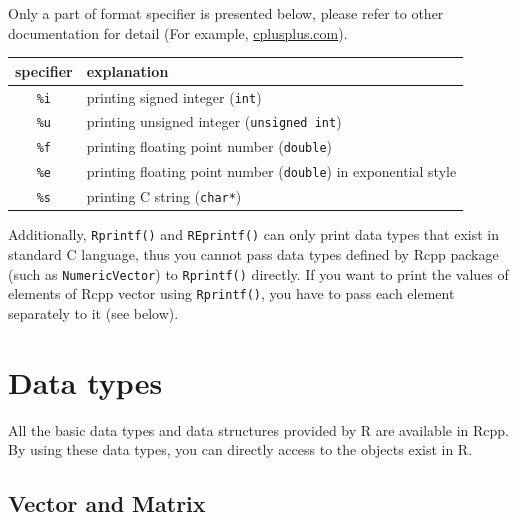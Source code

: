 \documentclass[]{book}
\newenvironment{Shaded}{\begin{snugshade}}{\end{snugshade}}
\newcommand{\DataTypeTok}[1]{\textcolor[rgb]{0.13,0.29,0.53}{#1}}
\newcommand{\DecValTok}[1]{\textcolor[rgb]{0.00,0.00,0.81}{#1}}
\newcommand{\SpecialCharTok}[1]{\textcolor[rgb]{0.00,0.00,0.00}{#1}}
\newcommand{\StringTok}[1]{\textcolor[rgb]{0.31,0.60,0.02}{#1}}
\newcommand{\CommentTok}[1]{\textcolor[rgb]{0.56,0.35,0.01}{\textit{#1}}}
\newcommand{\ControlFlowTok}[1]{\textcolor[rgb]{0.13,0.29,0.53}{\textbf{#1}}}
\newcommand{\NormalTok}[1]{#1}
\theoremstyle{definition}
\theoremstyle{definition}
\theoremstyle{remark}
\begin{document}
Only a part of format specifier is presented below, please refer to
other documentation for detail (For example,
\href{http://www.cplusplus.com/reference/cstdio/printf/}{cplusplus.com}).

\begin{longtable}[]{@{}cl@{}}
\toprule
specifier & explanation\tabularnewline
\midrule
\endhead
\texttt{\%i} & printing signed integer (\texttt{int})\tabularnewline
\texttt{\%u} & printing unsigned integer
(\texttt{unsigned\ int})\tabularnewline
\texttt{\%f} & printing floating point number
(\texttt{double})\tabularnewline
\texttt{\%e} & printing floating point number (\texttt{double}) in
exponential style\tabularnewline
\texttt{\%s} & printing C string (\texttt{char*})\tabularnewline
\bottomrule
\end{longtable}

Additionally, \texttt{Rprintf()} and \texttt{REprintf()} can only print
data types that exist in standard C language, thus you cannot pass data
types defined by Rcpp package (such as \texttt{NumericVector}) to
\texttt{Rprintf()} directly. If you want to print the values of elements
of Rcpp vector using \texttt{Rprintf()}, you have to pass each element
separately to it (see below).

\begin{Shaded}
\end{Shaded}

\chapter{Data types}\label{data-types}

All the basic data types and data structures provided by R are available
in Rcpp. By using these data types, you can directly access to the
objects exist in R.

\section{Vector and Matrix}\label{vector-and-matrix}
\end{document}
